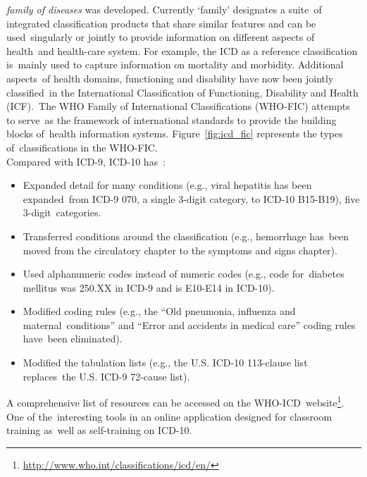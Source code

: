   \emph{family of diseases} was developed. Currently `family' designates a suite\
  of integrated classification products that share similar features and can be used\
  singularly or jointly to provide information on different aspects of health\
  and health-care system. For example, the ICD as a reference classification is\
  mainly used to capture information on mortality and morbidity. Additional aspects\
  of health domains, functioning and disability have now been jointly classified\
  in the International Classification of Functioning, Disability and Health (ICF).\
  The WHO Family of International Classifications (WHO-FIC) attempts to serve\
  as the framework of international standards to provide the building blocks of\
  health information systems. Figure~\ref{fig:icd_fic} represents the types of\
  classifications in the WHO-FIC.\\
  
  \noindent Compared with ICD-9, ICD-10 has~\citep{disantostefano_international_2009}:
  \begin{itemize}
    \itemsep0ex
    \item Expanded detail for many conditions (e.g., viral hepatitis has been expanded\
    from ICD-9 070, a single 3-digit category, to ICD-10 B15-B19), five 3-digit\
    categories.\
    \item Transferred conditions around the classification (e.g., hemorrhage has\
    been moved from the circulatory chapter to the symptoms and signs chapter).\
    \item Used alphanumeric codes instead of numeric codes (e.g., code for\
    diabetes mellitus was 250.XX in ICD-9 and is E10-E14 in ICD-10).
    \item Modified coding rules (e.g., the ``Old pneumonia, influenza and maternal\
    conditions'' and ``Error and accidents in medical care'' coding rules have\
    been eliminated).\
    \item Modified the tabulation lists (e.g., the U.S. ICD-10 113-clause list replaces\
    the U.S. ICD-9 72-cause list).
  \end{itemize}
  
  \noindent  A comprehensive list of resources can be accessed on the WHO-ICD\
  website\footnote{\url{http://www.who.int/classifications/icd/en/}}. One of the\
  interesting tools in an online application designed for classroom training as\
  well as self-training on ICD-10.
  
  